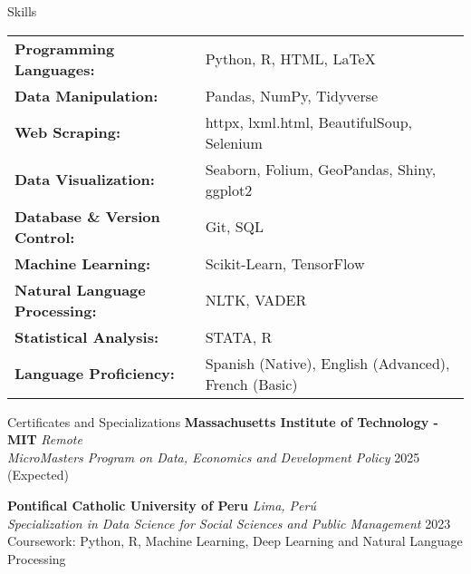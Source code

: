 \documentclass{resume} %
\begin{document}
\begin{rSection}{Skills}
    \begin{tabular}{@{} l l @{}}
    \textbf{Programming Languages:} & Python, R, HTML, LaTeX \\
    \textbf{Data Manipulation:} & Pandas, NumPy, Tidyverse\\
    \textbf{Web Scraping:} & httpx, lxml.html, BeautifulSoup, Selenium \\
    \textbf{Data Visualization:} & Seaborn, Folium, GeoPandas, Shiny, ggplot2 \\
    \textbf{Database \& Version Control:} & Git, SQL \\
    \textbf{Machine Learning:} & Scikit-Learn, TensorFlow \\
    \textbf{Natural Language Processing:} & NLTK, VADER \\
    \textbf{Statistical Analysis:} & STATA, R \\
    \textbf{Language Proficiency:} & Spanish (Native), English (Advanced), French (Basic)
    \end{tabular}
    \end{rSection}

\begin{rSection}{Certificates and Specializations}
    {\bf Massachusetts  Institute  of  Technology  -  MIT} \hfill \textit{Remote} \\
    \textit{MicroMasters Program on Data, Economics and Development Policy} \hfill {2025 (Expected)} 

    {\bf Pontifical Catholic University of Peru} \hfill \textit{Lima, Perú} \\
    \textit{Specialization in Data Science for Social Sciences and Public Management} \hfill {2023} \\
    Coursework: Python, R, Machine Learning, Deep Learning and Natural Language Processing
\end{rSection}
\end{document}
